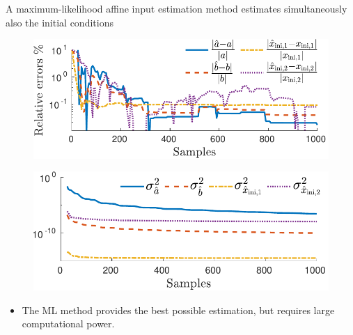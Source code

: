 \documentclass[presentation]{beamer}
\begin{document}
\begin{frame}[label={slide:affine-input-estimation5}]{A maximum-likelihood affine input estimation method estimates simultaneously also the initial conditions}
\begin{figure}
\centering
\includegraphics[width=0.6\columnwidth]{./fig/Aff_Fig_8.pdf} 
\end{figure}
\begin{figure}
\centering
\hspace*{0.75mm} \includegraphics[width=0.59\columnwidth]{./fig/Aff_Fig_9.pdf} 
\end{figure}
\begin{itemize}
	\color{blue}
	\item The ML method provides the best possible estimation, \linebreak but requires large computational power. 
\end{itemize}
\end{frame}
\end{document}
